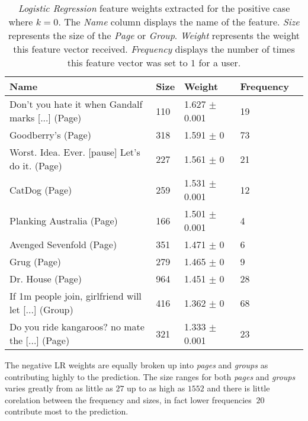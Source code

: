 \begin{table}[h]
\begin{minipage}[b]{1.0\textwidth}
\centering
  \begin{tabular}{|l|l|l|l|l|} %
  \hline
  \textbf{Name} & \textbf{Size} & \textbf{Weight} & \textbf{Frequency} \\ \hline

\small{Don't you hate it when Gandalf marks [...] (Page)} & 110 & 1.627 $\pm$ 0.001 & 19 \\ \hline
\small{Goodberry's (Page)} & 318 & 1.591 $\pm$ 0 & 73 \\ \hline
\small{Worst. Idea. Ever. [pause] Let's do it. (Page)} & 227 & 1.561 $\pm$ 0 & 21 \\ \hline
\small{CatDog (Page)} & 259 & 1.531 $\pm$ 0.001 & 12 \\ \hline
\small{Planking Australia (Page)} & 166 & 1.501 $\pm$ 0.001 & 4 \\ \hline
\small{Avenged Sevenfold (Page)} & 351 & 1.471 $\pm$ 0 & 6 \\ \hline
\small{Grug (Page)} & 279 & 1.465 $\pm$ 0 & 9 \\ \hline
\small{Dr. House (Page)} & 964 & 1.451 $\pm$ 0 & 28 \\ \hline
\small{If 1m people join, girlfriend will let [...] (Group)} & 416 & 1.362 $\pm$ 0 & 68 \\ \hline
\small{Do you ride kangaroos? no mate the [...] (Page)} & 321 & 1.333 $\pm$ 0.001 & 23 \\ \hline
  \end{tabular}
  \caption{\emph{Logistic Regression} feature weights extracted for the positive case where $k=0$. The \emph{Name} column displays the name of the feature.
                        \emph{Size} represents the size of the \emph{Page} or \emph{Group}.
                        \emph{Weight} represents the weight this feature vector received.  
                        \emph{Frequency} displays the number of times this feature vector was set to $1$ for a user.}
\end{minipage}
\end{table}

The negative LR weights are equally broken up into \emph{pages} and \emph{groups} as contributing highly to the prediction. The size ranges 
for both \emph{pages} and \emph{groups} varies greatly from as little as $27$ up to as high as $1552$ and there is little corelation between 
the frequency and sizes, in fact lower frequencies $~20$ contribute most to the prediction.

